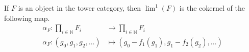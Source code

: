 


\begin{thm}\label{thm-lim1} 
  If $F$ is an object in the tower category, then $\lim^1(F)$ is the cokernel of the following map.
  \begin{align*}
    \alpha_F : \prod_{i \in \mathbb{N}} F_i &\to \prod_{i \in \mathbb{N}} F_i \\
    \alpha_F : (g_0, g_1, g_2, \ldots) &\mapsto \left(g_0 - f_1(g_1), g_1 - f_2(g_2), \ldots \right)
  \end{align*}
\end{thm}

